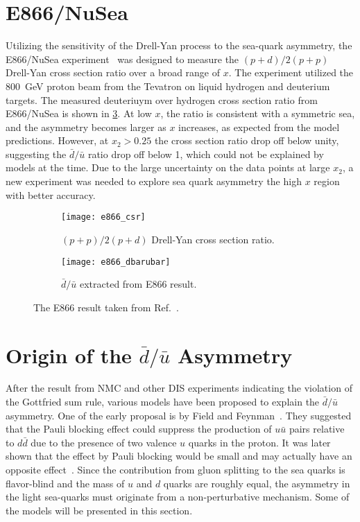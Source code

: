 \documentclass[../main.tex]{subfiles}
\begin{document}
\section{E866/NuSea}
\label{sec:E866}
Utilizing the sensitivity of the Drell-Yan process to the sea-quark asymmetry,
the E866/NuSea experiment~\cite{towell2001} was designed to measure the $(p+d)/2(p+p)$
Drell-Yan cross section ratio over a broad range of $x$. The
experiment utilized the \SI{800}{\GeV} proton beam from the Tevatron on liquid
hydrogen and deuterium targets. The measured deuteriuym over hydrogen cross section
ratio from E866/NuSea is shown in \cref{fig:e866_result}. At low $x$, the ratio is consistent
with a symmetric sea, and the asymmetry becomes larger as $x$ increases, as expected from
the model predictions. However, at $x_2>0.25$ the cross section ratio
drop off below unity, suggesting the $\bar{d}/\bar{u}$
ratio drop off below 1, which could not be explained by models at the time.
Due to the large uncertainty on the data points at large $x_2$, a new
experiment was needed to explore sea quark asymmetry the high $x$ region with better
accuracy.
\begin{figure}[htbp!]
	\centering
	\begin{subfigure}{0.45\linewidth}
		\texttt{[image: e866\_csr]}
		\caption{$(p+p)/2(p+d)$ Drell-Yan cross section ratio.}
		\label{subfig:e866_csr}
	\end{subfigure}
	\begin{subfigure}{0.45\linewidth}
		\texttt{[image: e866\_dbarubar]}
		\caption{$\bar{d}/\bar{u}$ extracted from E866 result.}
		\label{subfig:e866_dbarubar}
	\end{subfigure}
	\caption{The E866 result taken from Ref.~\cite{towell2001}.}
	\label{fig:e866_result}
\end{figure}

\section{Origin of the \texorpdfstring{$\bar{d}/\bar{u}$}{dbar/ubar} Asymmetry }
After the result from NMC and other DIS experiments indicating the violation of the Gottfried sum rule,
various models have been proposed to explain the $\bar{d}/\bar{u}$ asymmetry. One of the early proposal
is by Field and Feynman~\cite{field1977}. They suggested that the Pauli blocking effect
could suppress the production of $u\bar{u}$ pairs relative to  $d\bar{d}$ due to the presence of two
valence $u$ quarks in the proton. It was later shown that the effect by Pauli blocking would be small and
may actually have an opposite effect~\cite{steffens1997}. Since the contribution from gluon splitting to the
sea quarks is flavor-blind and the mass of $u$ and $d$ quarks are roughly equal, the asymmetry in the
light sea-quarks must originate from a non-perturbative mechanism. Some of the models will be presented
in this section.
\end{document}
